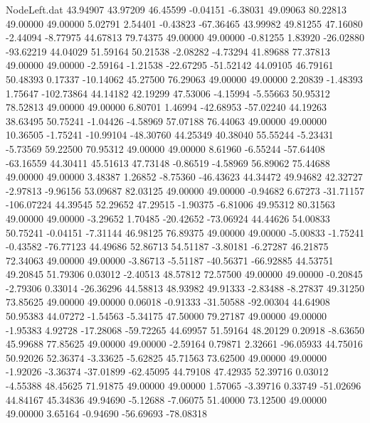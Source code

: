 \begin{filecontents}{NodeLeft.dat}
  43.94907   43.97209   46.45599    -0.04151   -6.38031   49.09063   80.22813   49.00000   49.00000    5.02791    2.54401   -0.43823  -67.36465
  43.99982   49.81255   47.16080    -2.44094   -8.77975   44.67813   79.74375   49.00000   49.00000   -0.81255    1.83920  -26.02880  -93.62219
  44.04029   51.59164   50.21538    -2.08282   -4.73294   41.89688   77.37813   49.00000   49.00000   -2.59164   -1.21538  -22.67295  -51.52142
  44.09105   46.79161   50.48393     0.17337  -10.14062   45.27500   76.29063   49.00000   49.00000    2.20839   -1.48393    1.75647 -102.73864
  44.14182   42.19299   47.53006    -4.15994   -5.55663   50.95312   78.52813   49.00000   49.00000    6.80701    1.46994  -42.68953  -57.02240
  44.19263   38.63495   50.75241    -1.04426   -4.58969   57.07188   76.44063   49.00000   49.00000   10.36505   -1.75241  -10.99104  -48.30760
  44.25349   40.38040   55.55244    -5.23431   -5.73569   59.22500   70.95312   49.00000   49.00000    8.61960   -6.55244  -57.64408  -63.16559
  44.30411   45.51613   47.73148    -0.86519   -4.58969   56.89062   75.44688   49.00000   49.00000    3.48387    1.26852   -8.75360  -46.43623
  44.34472   49.94682   42.32727    -2.97813   -9.96156   53.09687   82.03125   49.00000   49.00000   -0.94682    6.67273  -31.71157 -106.07224
  44.39545   52.29652   47.29515    -1.90375   -6.81006   49.95312   80.31563   49.00000   49.00000   -3.29652    1.70485  -20.42652  -73.06924
  44.44626   54.00833   50.75241    -0.04151   -7.31144   46.98125   76.89375   49.00000   49.00000   -5.00833   -1.75241   -0.43582  -76.77123
  44.49686   52.86713   54.51187    -3.80181   -6.27287   46.21875   72.34063   49.00000   49.00000   -3.86713   -5.51187  -40.56371  -66.92885
  44.53751   49.20845   51.79306     0.03012   -2.40513   48.57812   72.57500   49.00000   49.00000   -0.20845   -2.79306    0.33014  -26.36296
  44.58813   48.93982   49.91333    -2.83488   -8.27837   49.31250   73.85625   49.00000   49.00000    0.06018   -0.91333  -31.50588  -92.00304
  44.64908   50.95383   44.07272    -1.54563   -5.34175   47.50000   79.27187   49.00000   49.00000   -1.95383    4.92728  -17.28068  -59.72265
  44.69957   51.59164   48.20129     0.20918   -8.63650   45.99688   77.85625   49.00000   49.00000   -2.59164    0.79871    2.32661  -96.05933
  44.75016   50.92026   52.36374    -3.33625   -5.62825   45.71563   73.62500   49.00000   49.00000   -1.92026   -3.36374  -37.01899  -62.45095
  44.79108   47.42935   52.39716     0.03012   -4.55388   48.45625   71.91875   49.00000   49.00000    1.57065   -3.39716    0.33749  -51.02696
  44.84167   45.34836   49.94690    -5.12688   -7.06075   51.40000   73.12500   49.00000   49.00000    3.65164   -0.94690  -56.69693  -78.08318

\end{filecontents}
